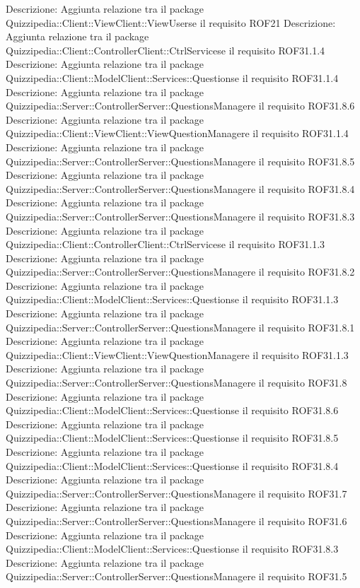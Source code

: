 Descrizione: Aggiunta relazione tra il package Quizzipedia::Client::ViewClient::ViewUserse il requisito ROF21 
Descrizione: Aggiunta relazione tra il package Quizzipedia::Client::ControllerClient::CtrlServicese il requisito ROF31.1.4 
Descrizione: Aggiunta relazione tra il package Quizzipedia::Client::ModelClient::Services::Questionse il requisito ROF31.1.4 
Descrizione: Aggiunta relazione tra il package Quizzipedia::Server::ControllerServer::QuestionsManagere il requisito ROF31.8.6 
Descrizione: Aggiunta relazione tra il package Quizzipedia::Client::ViewClient::ViewQuestionManagere il requisito ROF31.1.4 
Descrizione: Aggiunta relazione tra il package Quizzipedia::Server::ControllerServer::QuestionsManagere il requisito ROF31.8.5 
Descrizione: Aggiunta relazione tra il package Quizzipedia::Server::ControllerServer::QuestionsManagere il requisito ROF31.8.4 
Descrizione: Aggiunta relazione tra il package Quizzipedia::Server::ControllerServer::QuestionsManagere il requisito ROF31.8.3 
Descrizione: Aggiunta relazione tra il package Quizzipedia::Client::ControllerClient::CtrlServicese il requisito ROF31.1.3 
Descrizione: Aggiunta relazione tra il package Quizzipedia::Server::ControllerServer::QuestionsManagere il requisito ROF31.8.2 
Descrizione: Aggiunta relazione tra il package Quizzipedia::Client::ModelClient::Services::Questionse il requisito ROF31.1.3 
Descrizione: Aggiunta relazione tra il package Quizzipedia::Server::ControllerServer::QuestionsManagere il requisito ROF31.8.1 
Descrizione: Aggiunta relazione tra il package Quizzipedia::Client::ViewClient::ViewQuestionManagere il requisito ROF31.1.3 
Descrizione: Aggiunta relazione tra il package Quizzipedia::Server::ControllerServer::QuestionsManagere il requisito ROF31.8 
Descrizione: Aggiunta relazione tra il package Quizzipedia::Client::ModelClient::Services::Questionse il requisito ROF31.8.6 
Descrizione: Aggiunta relazione tra il package Quizzipedia::Client::ModelClient::Services::Questionse il requisito ROF31.8.5 
Descrizione: Aggiunta relazione tra il package Quizzipedia::Client::ModelClient::Services::Questionse il requisito ROF31.8.4 
Descrizione: Aggiunta relazione tra il package Quizzipedia::Server::ControllerServer::QuestionsManagere il requisito ROF31.7 
Descrizione: Aggiunta relazione tra il package Quizzipedia::Server::ControllerServer::QuestionsManagere il requisito ROF31.6 
Descrizione: Aggiunta relazione tra il package Quizzipedia::Client::ModelClient::Services::Questionse il requisito ROF31.8.3 
Descrizione: Aggiunta relazione tra il package Quizzipedia::Server::ControllerServer::QuestionsManagere il requisito ROF31.5 
